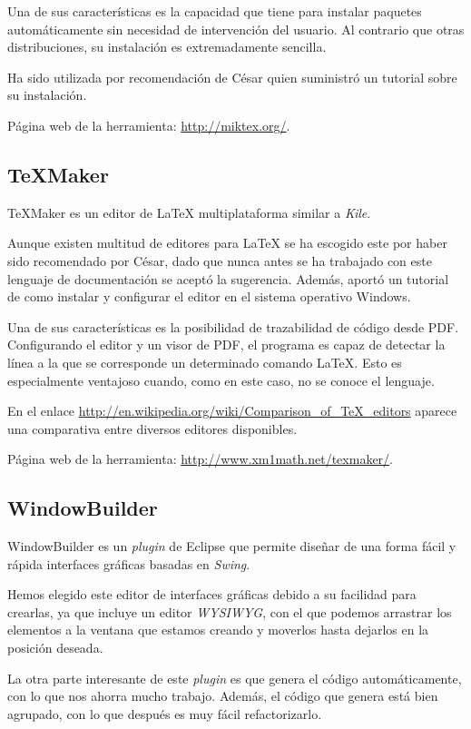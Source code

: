 Una de sus características es la capacidad que tiene para instalar paquetes automáticamente sin necesidad de intervención del usuario. Al contrario que otras distribuciones, su instalación es extremadamente sencilla.

Ha sido utilizada por recomendación de César quien suministró un tutorial sobre su instalación.

Página web de la herramienta: \url{http://miktex.org/}.


\subsection{\TeX{}Maker}
\TeX{}Maker es un editor de \LaTeX{} multiplataforma similar a \textit{Kile}.

Aunque existen multitud de editores para \LaTeX{} se ha escogido este por haber sido recomendado por César, dado que nunca antes se ha trabajado con este lenguaje de documentación se aceptó la sugerencia. Además, aportó un tutorial de como instalar y configurar el editor en el sistema operativo Windows.

Una de sus características es la posibilidad de trazabilidad de código desde PDF. Configurando el editor y un visor de PDF, el programa es capaz de detectar la línea a la que se corresponde un determinado comando \LaTeX{}. Esto es especialmente ventajoso cuando, como en este caso, no se conoce el lenguaje.

En el enlace \url{http://en.wikipedia.org/wiki/Comparison_of_TeX_editors} aparece una comparativa entre diversos editores disponibles.

Página web de la herramienta: \url{http://www.xm1math.net/texmaker/}.

\subsection{WindowBuilder}
WindowBuilder es un \textit{plugin} de Eclipse que permite diseñar de una forma fácil y rápida interfaces gráficas basadas en \textit{Swing}.

Hemos elegido este editor de interfaces gráficas debido a su facilidad para crearlas, ya que incluye un editor \textit{WYSIWYG}, con el que podemos arrastrar los elementos a la ventana que estamos creando y moverlos hasta dejarlos en la posición deseada.

La otra parte interesante de este \textit{plugin} es que genera el código automáticamente, con lo que nos ahorra mucho trabajo. Además, el código que genera está bien agrupado, con lo que después es muy fácil refactorizarlo.

